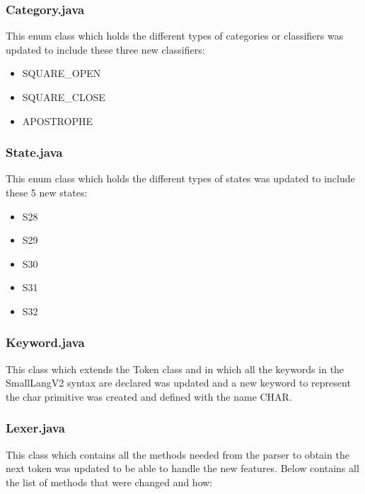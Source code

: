 \documentclass{article}
\begin{document}
				\subsubsection{Category.java}
					
					This enum class which holds the different types of categories or classifiers was updated to include these three new classifiers:
					\begin{itemize}
						\item SQUARE\_OPEN
						\item SQUARE\_CLOSE
    						\item APOSTROPHE
					\end{itemize}
					
				      \subsubsection{State.java}
					
					This enum class which holds the different types of states was updated to include these 5 new states:
					\begin{itemize}
						\item S28
						\item S29
    						\item S30
    						\item S31
    						\item S32
					\end{itemize}
					
					\subsubsection{Keyword.java}
					
					This class which extends the Token class and in which all the keywords in the SmallLangV2 syntax are declared was updated and a new keyword to represent the char primitive was created and defined with the name CHAR.
					
					\subsubsection{Lexer.java}
					
					This class which contains all the methods needed from the parser to obtain the next token was updated to be able to handle the new features. Below contains all the list of methods that were changed and how:
					
\end{document}
